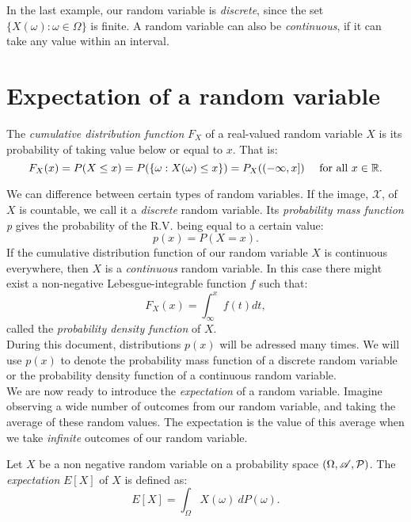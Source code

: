 In the last example, our random variable is \emph{discrete}, since the set $\{X(\omega): \omega \in \Omega\}$ is finite.
 A random variable can also be \emph{continuous}, if it can take any value within an interval.\\


\section{Expectation of a random variable}

\begin{ndef}
The \emph{cumulative distribution function } $F_X$ of a real-valued random variable $X$ is its probability of taking value below or equal to $x$. That is:
$$
F_X(x) = P(X \leq x) = P(\{\omega : X(\omega) \leq x\}) = P_X((-\infty,x]) \quad \text{ for all } x \in \mathbb{R} .
$$
\end{ndef}

We can difference between certain types of random variables. If the image, $\mathcal X$, of $X$ is countable, we call it a \emph{discrete} random variable. Its \emph{probability mass function p} gives the
probability of the R.V. being equal to a certain value:
$$
p(x) = P(X = x).
$$
If the cumulative distribution function of our random variable $X$ is continuous everywhere, then $X$ is a \emph{continuous} random variable.
 In this case there might exist a non-negative Lebesgue-integrable function $f$ such that:
$$
F_X(x) = \int_{\infty}^x f(t) dt,
$$
called the \emph{probability density function} of $X$.\\

During this document, distributions $p(x)$ will be adressed many times. We will use $p(x)$ to denote the probability mass function of a discrete random variable or the probability density function of a continuous random variable. \\

We are now ready to introduce the \emph{expectation} of a random variable. Imagine observing a wide number of outcomes from our random variable, and taking the average of these random values. The expectation is the value of this average when we 
take \emph{infinite} outcomes of our random variable.

\begin{ndef}\label{def:expectation}
Let $X$ be a non negative random variable on a probability space $(\Omega,\mathscr{A},\mathcal{P})$. The \emph{expectation} $E[X]$ of $X$ is defined as:
$$
E[X] = \int_\Omega X(\omega) \ dP(\omega).
$$
\end{ndef}

